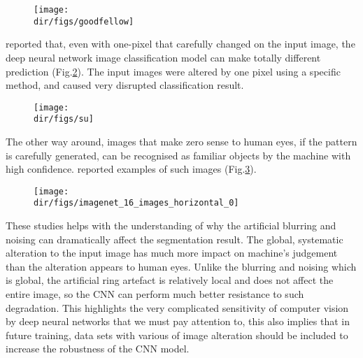\begin{figure}[htbp]
  \centering
  \texttt{[image: \\dir/figs/goodfellow]}
  \caption{}
  \label{goodfellow}
\end{figure}

\citet{su2019one} reported that, even with one-pixel that carefully changed on the input image, the deep neural network image classification model can make totally different prediction (Fig.\ref{su}). The input images were altered by one pixel using a specific method, and caused very disrupted classification result.

\begin{figure}[htbp]
  \centering
  \texttt{[image: \\dir/figs/su]}
  \caption{}
  \label{su}
\end{figure}

The other way around, images that make zero sense to human eyes, if the pattern is carefully generated, can be recognised as familiar objects by the machine with high confidence. \citet{nguyen2015deep} reported examples of such images (Fig.\ref{imagenet}). 

\begin{figure}[htbp]
  \centering
  \texttt{[image: \\dir/figs/imagenet\_16\_images\_horizontal\_0]}
  \caption{}
  \label{imagenet}
\end{figure}

These studies helps with the understanding of why the artificial blurring and noising can dramatically affect the segmentation result. The global, systematic alteration to the input image has much more impact on machine's judgement than the alteration appears to human eyes. Unlike the blurring and noising which is global, the artificial ring artefact is relatively local and does not affect the entire image, so the CNN can perform much better resistance to such degradation. This highlights the very complicated sensitivity of computer vision by deep neural networks that we must pay attention to, this also implies that in future training, data sets with various of image alteration should be included to increase the robustness of the CNN model.


